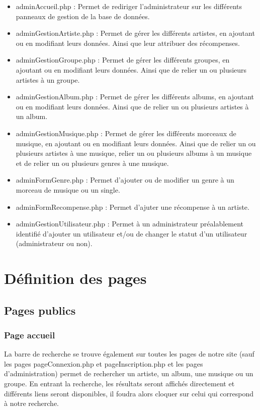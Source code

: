 	\begin{paragraphe}
		\begin{itemize}
			\item adminAccueil.php : Permet de rediriger l'administrateur sur les différents panneaux de gestion de la base de données.
			\item adminGestionArtiste.php : Permet de gérer les différents artistes, en ajoutant ou en modifiant leurs données. Ainsi que leur attribuer des récompenses.
			\item adminGestionGroupe.php : Permet de gérer les différents groupes, en ajoutant ou en modifiant leurs données. Ainsi que de relier un ou plusieurs artistes à un groupe.
			\item adminGestionAlbum.php : Permet de gérer les différents albums, en ajoutant ou en modifiant leurs données. Ainsi que de relier un ou plusieurs artistes à un album.
			\item adminGestionMusique.php : Permet de gérer les différents morceaux de musique, en ajoutant ou en modifiant leurs données. Ainsi que de relier un ou plusieurs artistes à une musique, relier un ou plusieurs albums à un musique et de relier un ou plusieurs genres à une musique.
			\item adminFormGenre.php : Permet d'ajouter ou de modifier un genre à un morceau de musique ou un single.
			\item adminFormRecompense.php : Permet d'ajuter une récompense à un artiste.
			\item adminGestionUtilisateur.php : Permet à un administrateur préalablement identifié d'ajouter un utilisateur et/ou de changer le statut d'un utilisateur (administrateur ou non).
		\end{itemize}
	\end{paragraphe}

\newpage

\section{Définition des pages}

	\subsection{Pages publics}
		\subsubsection{Page accueil}

			\begin{paragraphe}
				La barre de recherche se trouve également sur toutes les pages de notre site (sauf les pages pageConnexion.php et pageInscription.php et les pages d'administration) permet de rechercher un artiste, un album, une musique ou un groupe. En entrant la recherche, les résultats seront affichés directement et différents liens seront disponibles, il foudra alors cloquer sur celui qui correspond à notre recherche.
			\end{paragraphe}

